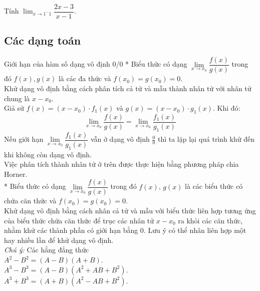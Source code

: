 \begin{vd}%
Tính $\displaystyle \lim_{x \to 1^-1}\dfrac{2x - 3}{x - 1}$.
\end{vd}
\subsection{Các dạng toán}
\begin{dang}{Giới hạn của hàm số dạng vô định 0/0}
* Biểu thức có dạng $\lim\limits_{x\to x_0}\dfrac{f(x)}{g(x)}$ trong đó $f(x), g(x)$ là các đa thức và $f(x_0)=g(x_0)=0$.\\
Khử dạng vô định bằng cách phân tích cả tử và mẫu thành nhân tử với nhân tử chung là $x-x_0$.\\
Giả sử $f(x)=(x-x_0) \cdot f_1(x)$ và $g(x)=(x-x_0) \cdot g_1(x)$. Khi đó:
$$\lim\limits_{x\to x_0}\frac{f(x)}{g(x)}=\lim\limits_{x\to x_0}\frac{f_1(x)}{g_1(x)}$$
Nếu giới hạn $\lim\limits_{x\to x_0}\dfrac{f_1(x)}{g_1(x)}$ vẫn ở dạng vô định $\displaystyle\frac{0}{0}$ thì ta lặp lại quá trình khử đến khi không còn dạng vô định.\\
Việc phân tích thành nhân tử ở trên được thực hiện bằng phương pháp chia Horner.\\

* Biểu thức có dạng $\lim\limits_{x\to x_0}\dfrac{f(x)}{g(x)}$ trong đó $f(x)$, $g(x)$ là các biểu thức có chứa căn thức và $f(x_0)=g(x_0)=0$.\\
Khử dạng vô định bằng cách nhân cả tử và mẫu với biểu thức liên hợp tương ứng của biểu thức chứa căn thức để trục các nhân tử $x-x_0$ ra khỏi các căn thức, nhằm khử các thành phần có giới hạn bằng 0. Lưu ý có thể nhân liên hợp một hay nhiều lần để khử dạng vô định.\\
\textit{Chú ý:} Các hằng đẳng thức\\
\hspace{1.5cm} $A^2-B^2=(A-B)(A+B)$.\\
\hspace{1.5cm} $A^3-B^3=(A-B)(A^2+AB+B^2)$.\\
\hspace{1.5cm} $A^3+B^3=(A+B)(A^2-AB+B^2)$.
\end{dang}

